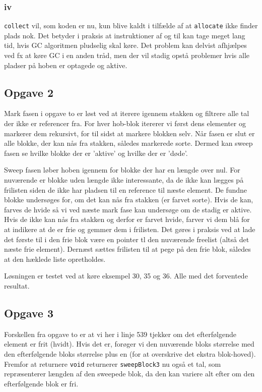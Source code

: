 \documentclass{article}
\begin{document}
\subsubsection*{iv}
\texttt{collect} vil, som koden er nu, kun blive kaldt i tilfælde af at \texttt{allocate} ikke finder plads nok. Det betyder i praksis at instruktioner af og til kan tage meget lang tid, hvis GC algoritmen pludselig skal køre. Det problem kan delvist afhjælpes ved fx at køre GC i en anden tråd, men der vil stadig opstå problemer hvis alle pladser på hoben er optagede og aktive.

\subsection*{Opgave 2}
Mark fasen i opgave to er løst ved at iterere igennem stakken og filtrere alle tal der ikke er referencer fra. For hver hob-blok itererer vi først dens elementer og markerer dem rekursivt, for til sidst at markere blokken selv. Når fasen er slut er alle blokke, der kan nås fra stakken, således markerede sorte. Dermed kan sweep fasen se hvilke blokke der er 'aktive' og hvilke der er 'døde'.

Sweep fasen løber hoben igennem for blokke der har en længde over nul. For nuværende er blokke uden længde ikke interessante, da de ikke kan lægges på frilisten siden de ikke har pladsen til en reference til næste element. De fundne blokke undersøges for, om det kan nås fra stakken (er farvet sorte). Hvis de kan, farves de hvide så vi ved næste mark fase kan undersøge om de stadig er aktive. Hvis de ikke kan nås fra stakken og derfor er farvet hvide, farver vi dem blå for at indikere at de er frie og gemmer dem i frilisten. Det gøres i praksis ved at lade det første til i den frie blok være en pointer tl den nuværende freelist (altså det næste frie element). Dernæst sættes frilisten til at pege på den frie blok, således at den hæklede liste opretholdes. 

Løsningen er testet ved at køre eksempel 30, 35 og 36. Alle med det forventede resultat.

\subsection*{Opgave 3}
Forskellen fra opgave to er at vi her i linje 539 tjekker om det efterfølgende element er frit (hvidt). Hvis det er, forøger vi den nuværende bloks størrelse med den efterfølgende bloks størrelse plus en (for at overskrive det ekstra blok-hoved). Fremfor at returnere \texttt{void} returnerer \texttt{sweepBlock3} nu også et tal, som repræsenterer længden af den sweepede blok, da den kan variere alt efter om den efterfølgende blok er fri.
\end{document}
